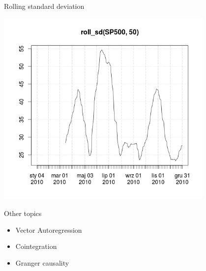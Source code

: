 \documentclass{beamer}
\begin{document}
\begin{frame}{Rolling standard deviation}
\begin{center}
\includegraphics[width=0.8\textwidth]{img/roll_sd.png}
\end{center}
\end{frame}

\begin{frame}{Other topics}
\begin{itemize}
\item Vector Autoregression
\item Cointegration
\item Granger causality
\end{itemize}
\end{frame}
\end{document}
